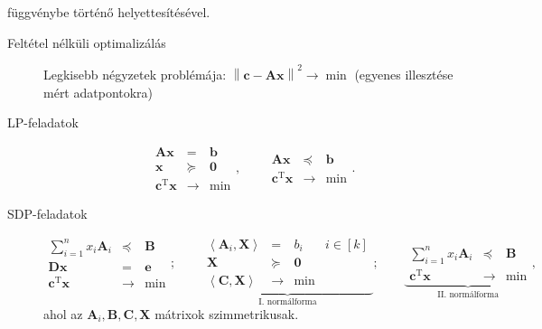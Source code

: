 \documentclass[%
	DIV=15,appendixprefix]{scrreprt}
\theoremstyle{definition}
\theoremstyle{remark}
\DeclareMathOperator{\T}{T}
\begin{document}
függvénybe történő helyettesítésével.
\begin{description}
	\item[Feltétel nélküli optimalizálás] Legkisebb négyzetek problémája: $ \left\| \mathbf{ c } -
		\mathbf{ A } \mathbf{ x } \right\|^{ 2 } \rightarrow \min $ (egyenes illesztése mért
		adatpontokra)
	\item[LP-feladatok] \begin{equation}\tag{LP}
			\begin{array}{rcl}
				\mathbf{ A } \mathbf{ x }			&	=			&	\mathbf{ b }\\
				\mathbf{ x }						&	\succeq		&	\mathbf{ 0 }\\
				\hline
				\mathbf{ c }^{ \T } \mathbf{ x }	&	\rightarrow	&	\min
			\end{array}, \qquad \begin{array}{rcl}
				\mathbf{ A } \mathbf{ x }			&	\preceq		&	\mathbf{ b }\\
				\hline
				\mathbf{ c }^{ \T } \mathbf{ x }	&	\rightarrow	&	\min
			\end{array}.
		\end{equation}
	\item[SDP-feladatok] \begin{equation}\tag{SDP}
			\begin{array}{rcl}
				\sum_{ i = 1 }^{ n } x_{ i } \mathbf{ A }_{ i }		&	\preceq	&	\mathbf{ B }\\
				\mathbf{ D } \mathbf{ x }							&	=	&	\mathbf{ e }\\
				\hline
				\mathbf{ c }^{ \T } \mathbf{ x }	&	\rightarrow	&	\min
			\end{array}; \qquad \underbrace{\begin{array}{rcll}
				\left\langle \mathbf{ A }_{ i },{} \mathbf{ X } \right\rangle	&	=	&
					b_{ i }			&	i \in \left[ k \right]\\
				\mathbf{ X }													&	\succeq	&
					\mathbf{ 0 }	&\\
				\hline
				\left\langle \mathbf{ C },{} \mathbf{ X } \right\rangle			&	\rightarrow	&
					\min			&
			\end{array}}_{\text{I. normálforma}}; \qquad \underbrace{\begin{array}{rcl}
				\sum_{ i = 1 }^{ n } x_{ i } \mathbf{ A }_{ i }		&	\preceq	&	\mathbf{ B }\\
				\hline
				\mathbf{ c }^{ \T } \mathbf{ x }	&	\rightarrow	&	\min
			\end{array}}_{\text{II. normálforma}},
		\end{equation}
		ahol az $ \mathbf{ A }_{ i },{} \mathbf{ B },{} \mathbf{ C },{} \mathbf{ X } $ mátrixok
		szimmetrikusak.
\end{description}
\end{document}
